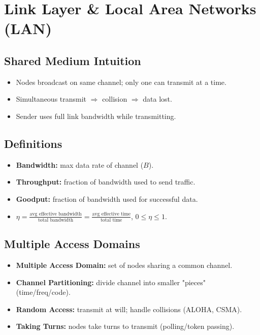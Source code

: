 \section{Link Layer \& Local Area Networks (LAN)}
\subsection{Shared Medium Intuition}
\begin{itemize}
	\item Nodes broadcast on same channel; only one can transmit at a time.
	\item Simultaneous transmit $\Rightarrow$ collision $\Rightarrow$ data lost.
	\item Sender uses full link bandwidth while transmitting.
\end{itemize}

\subsection{Definitions}
\begin{itemize}
	\item \textbf{Bandwidth:} max data rate of channel ($B$).
	\item \textbf{Throughput:} fraction of bandwidth used to send traffic.
	\item \textbf{Goodput:} fraction of bandwidth used for successful data.
	\item $\eta=\frac{\text{avg effective bandwidth}}{\text{total bandwidth}}=\frac{\text{avg effective time}}{\text{total time}}$, $0\le\eta\le1$.
\end{itemize}

\subsection{Multiple Access Domains}
\begin{itemize}
    \item \textbf{Multiple Access Domain:} set of nodes sharing a common channel.
    \item \textbf{Channel Partitioning:} divide channel into smaller "pieces" (time/freq/code).
    \item \textbf{Random Access:} transmit at will; handle collisions (ALOHA, CSMA).
    \item \textbf{Taking Turns:} nodes take turns to transmit (polling/token passing).
\end{itemize}
